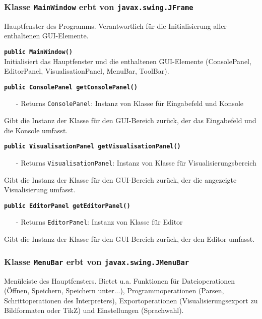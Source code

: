 \documentclass[parskip=full,11pt,twoside]{scrartcl}
\begin{document}
\subsubsection{Klasse \texttt{MainWindow} erbt von \texttt{javax.swing.JFrame}}

Hauptfenster des Programms. Verantwortlich für die Initialisierung aller enthaltenen GUI-Elemente.

\textbf{\texttt{public MainWindow()}}\\
Initialisiert das Hauptfenster und die enthaltenen GUI-Elemente (ConsolePanel, EditorPanel, VisualisationPanel, MenuBar, ToolBar).

\textbf{\texttt{public ConsolePanel getConsolePanel()}}
\begin{itemize}[noitemsep]
	\item[-] Returns \texttt{ConsolePanel}: Instanz von Klasse für Eingabefeld und Konsole
\end{itemize}
Gibt die Instanz der Klasse für den GUI-Bereich zurück, der das Eingabefeld und die Konsole umfasst.

\textbf{\texttt{public VisualisationPanel getVisualisationPanel()}}
\begin{itemize}[noitemsep]
	\item[-] Returns \texttt{VisualisationPanel}: Instanz von Klasse für Visualisierungsbereich
\end{itemize}
Gibt die Instanz der Klasse für den GUI-Bereich zurück, der die angezeigte Visualisierung umfasst.

\textbf{\texttt{public EditorPanel getEditorPanel()}}
\begin{itemize}[noitemsep]
	\item[-] Returns \texttt{EditorPanel}: Instanz von Klasse für Editor
\end{itemize}
Gibt die Instanz der Klasse für den GUI-Bereich zurück, der den Editor umfasst.

\subsubsection{Klasse \texttt{MenuBar} erbt von \texttt{javax.swing.JMenuBar}}

Menüleiste des Hauptfensters. Bietet u.a. Funktionen für Dateioperationen (Öffnen, Speichern, Speichern unter...), Programmoperationen (Parsen, Schrittoperationen des Interpreters), Exportoperationen (Visualisierungsexport zu Bildformaten oder TikZ) und Einstellungen (Sprachwahl).
\end{document}
